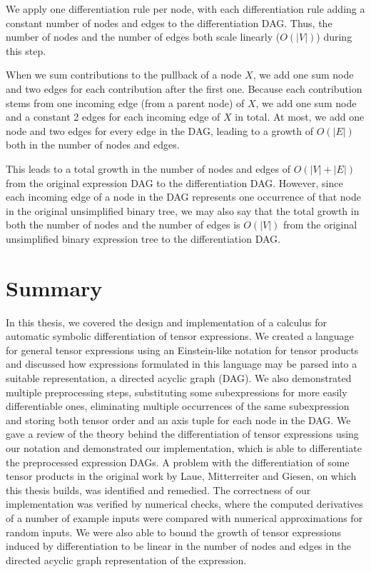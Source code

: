 \documentclass[12pt, a4paper]{report}
\begin{document}
We apply one differentiation rule per node, with each differentiation rule adding a constant number of nodes and edges to the differentiation DAG.
Thus, the number of nodes and the number of edges both scale linearly ($O(|V|)$) during this step.

When we sum contributions to the pullback of a node $X$, we add one sum node and two edges for each contribution after the first one.
Because each contribution stems from one incoming edge (from a parent node) of $X$, we add one sum node and a constant 2 edges for each incoming edge of $X$ in total.
At most, we add one node and two edges for every edge in the DAG, leading to a growth of $O(|E|)$ both in the number of nodes and edges.

This leads to a total growth in the number of nodes and edges of $O(|V| + |E|)$ from the original expression DAG to the differentiation DAG.
However, since each incoming edge of a node in the DAG represents one occurrence of that node in the original unsimplified binary tree, we may also say that the total growth in both the number of nodes and the number of edges is $O(|V|)$ from the original unsimplified binary expression tree to the differentiation DAG.

\chapter{Summary}
In this thesis, we covered the design and implementation of a calculus for automatic symbolic differentiation of tensor expressions.
We created a language for general tensor expressions using an Einstein-like notation for tensor products and discussed how expressions formulated in this language may be parsed into a suitable representation, a directed acyclic graph (DAG).
We also demonstrated multiple preprocessing steps, substituting some subexpressions for more easily differentiable ones, eliminating multiple occurrences of the same subexpression and storing both tensor order and an axis tuple for each node in the DAG.
We gave a review of the theory behind the differentiation of tensor expressions using our notation and demonstrated our implementation, which is able to differentiate the preprocessed expression DAGs.
A problem with the differentiation of some tensor products in the original work \cite{tensorpaper} by Laue, Mitterreiter and Giesen, on which this thesis builds, was identified and remedied.
The correctness of our implementation was verified by numerical checks, where the computed derivatives of a number of example inputs were compared with numerical approximations for random inputs.
We were also able to bound the growth of tensor expressions induced by differentiation to be linear in the number of nodes and edges in the directed acyclic graph representation of the expression.
\end{document}

